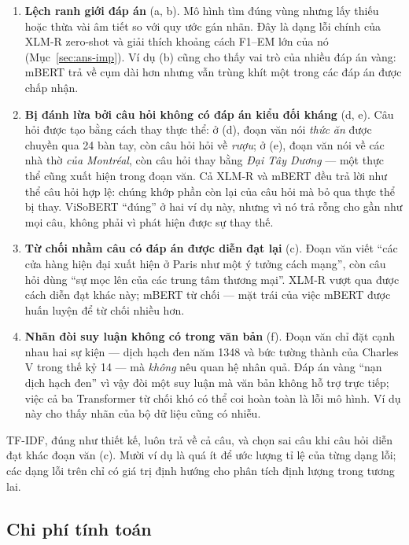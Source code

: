 \begin{enumerate}
  \item \textbf{Lệch ranh giới đáp án} (a, b). Mô hình tìm đúng vùng nhưng lấy thiếu hoặc thừa
        vài âm tiết so với quy ước gán nhãn. Đây là dạng lỗi chính của XLM-R zero-shot và giải
        thích khoảng cách F1--EM lớn của nó (Mục~\ref{sec:ans-imp}). Ví dụ (b) cũng cho thấy vai
        trò của nhiều đáp án vàng: mBERT trả về cụm dài hơn nhưng vẫn trùng khít một trong các
        đáp án được chấp nhận.
  \item \textbf{Bị đánh lừa bởi câu hỏi không có đáp án kiểu đối kháng} (d, e). Câu hỏi được
        tạo bằng cách thay thực thể: ở (d), đoạn văn nói \emph{thức ăn} được chuyền qua 24 bàn
        tay, còn câu hỏi hỏi về \emph{rượu}; ở (e), đoạn văn nói về các nhà thờ \emph{của
        Montréal}, còn câu hỏi thay bằng \emph{Đại Tây Dương} --- một thực thể cũng xuất hiện trong
        đoạn văn. Cả XLM-R và mBERT đều trả lời như thể câu hỏi hợp lệ: chúng khớp phần còn lại
        của câu hỏi mà bỏ qua thực thể bị thay. ViSoBERT ``đúng'' ở hai ví dụ này, nhưng vì nó trả
        rỗng cho gần như mọi câu, không phải vì phát hiện được sự thay thế.
  \item \textbf{Từ chối nhầm câu có đáp án được diễn đạt lại} (c). Đoạn văn viết ``các cửa hàng
        hiện đại xuất hiện ở Paris như một ý tưởng cách mạng'', còn câu hỏi dùng ``sự mọc lên của
        các trung tâm thương mại''. XLM-R vượt qua được cách diễn đạt khác này; mBERT từ chối ---
        mặt trái của việc mBERT được huấn luyện để từ chối nhiều hơn.
  \item \textbf{Nhãn đòi suy luận không có trong văn bản} (f). Đoạn văn chỉ đặt cạnh nhau hai sự
        kiện --- dịch hạch đen năm 1348 và bức tường thành của Charles V trong thế kỷ 14 --- mà
        \emph{không} nêu quan hệ nhân quả. Đáp án vàng ``nạn dịch hạch đen'' vì vậy đòi một suy
        luận mà văn bản không hỗ trợ trực tiếp; việc cả ba Transformer từ chối khó có thể coi hoàn
        toàn là lỗi mô hình. Ví dụ này cho thấy nhãn của bộ dữ liệu cũng có nhiễu.
\end{enumerate}

\noindent TF-IDF, đúng như thiết kế, luôn trả về cả câu, và chọn sai câu khi câu hỏi diễn đạt khác
đoạn văn (c). Mười ví dụ là quá ít để ước lượng tỉ lệ của từng dạng lỗi; các dạng lỗi trên chỉ có
giá trị định hướng cho phân tích định lượng trong tương lai.

\subsection{Chi phí tính toán}
\label{sec:cost}

